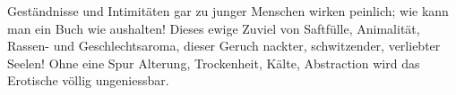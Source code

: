 Geständnisse und Intimitäten gar zu junger Menschen wirken peinlich; wie kann man ein Buch wie  aushalten! Dieses ewige Zuviel von Saftfülle, Animalität, Rassen- und Geschlechtsaroma, dieser Geruch nackter, schwitzender, verliebter Seelen! Ohne eine Spur Alterung, Trockenheit, Kälte, Abstraction wird das Erotische völlig ungeniessbar.
\par

